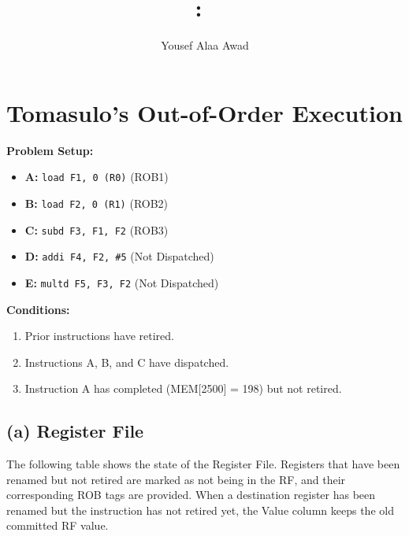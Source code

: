 \documentclass{article}
\title{
    \vspace{2in}
    \textmd{\textbf{\hmwkClass:\ \hmwkTitle}}\\
    \normalsize\vspace{0.1in}
}
\author{Yousef Alaa Awad}
\begin{document}
\maketitle
\pagebreak

\section{Tomasulo's Out-of-Order Execution}

\textbf{Problem Setup:}
\begin{itemize}
	\item \textbf{A:} \texttt{load F1, 0 (R0)} (ROB1)
	\item \textbf{B:} \texttt{load F2, 0 (R1)} (ROB2)
	\item \textbf{C:} \texttt{subd F3, F1, F2} (ROB3)
	\item \textbf{D:} \texttt{addi F4, F2, \#5} (Not Dispatched)
	\item \textbf{E:} \texttt{multd F5, F3, F2} (Not Dispatched)
\end{itemize}

\textbf{Conditions:}
\begin{enumerate}
	\item Prior instructions have retired.
	\item Instructions A, B, and C have dispatched.
	\item Instruction A has completed (MEM[2500] = 198) but not retired.
\end{enumerate}

\subsection{(a) Register File}
The following table shows the state of the Register File.
Registers that have been renamed but not retired are marked as not being in the RF, and their corresponding ROB tags are provided.
When a destination register has been renamed but the instruction has not retired yet, the Value column keeps the old committed RF value.
\end{document}
